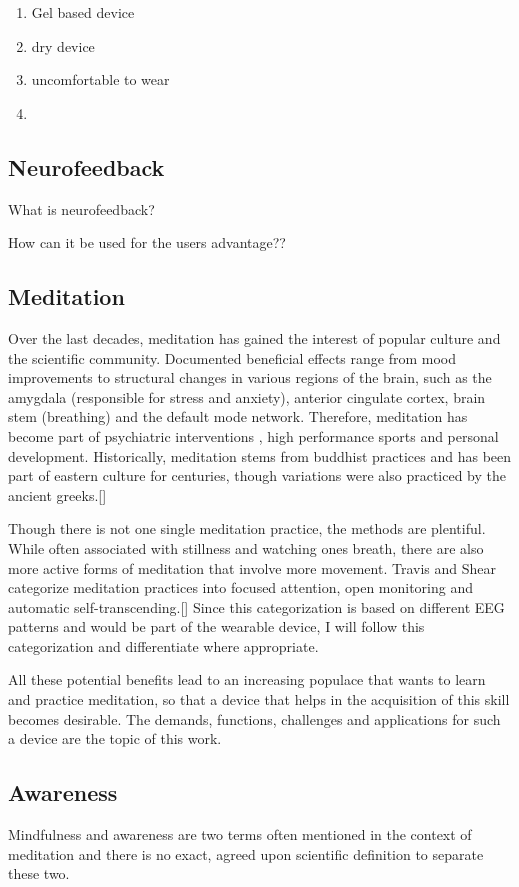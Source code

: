 \documentclass{llncs} %
\begin{document}
\begin{enumerate}
    \item Gel based device
    \item dry device
    \item uncomfortable to wear 
    \item 
\end{enumerate}
\subsection{Neurofeedback}
What is neurofeedback?

How can it be used for the users advantage??
\subsection{Meditation}
Over the last decades, meditation has gained the interest of popular culture and the scientific community.
Documented beneficial effects range from mood improvements to structural changes in various regions of the brain, such as the amygdala (responsible for stress and anxiety), anterior cingulate cortex, brain stem (breathing)
and the default mode network. \cite{Tang:et al}
Therefore, meditation has become part of psychiatric interventions \cite{Hoelzel}, high performance sports and personal development.
Historically, meditation stems from buddhist practices and has been part of eastern culture for centuries, though variations were also practiced by the ancient greeks.[]

Though there is not one single meditation practice, the methods are plentiful. While often associated with stillness and watching ones breath,
there are also more active forms of meditation that involve more movement. Travis and Shear categorize meditation practices into focused attention, open monitoring and automatic self-transcending.[] 
Since this categorization is based on different EEG patterns and would be part of the wearable device, I will follow this categorization and differentiate where appropriate.

All these potential benefits lead to an increasing populace that wants to learn and practice meditation, so that a device that helps in the acquisition of this skill becomes desirable. 
The demands, functions, challenges and applications for such a device are the topic of this work.
\subsection{Awareness}
Mindfulness and awareness are two terms often mentioned in the context of meditation and there is no exact, agreed upon scientific definition to separate these two.
\end{document}
